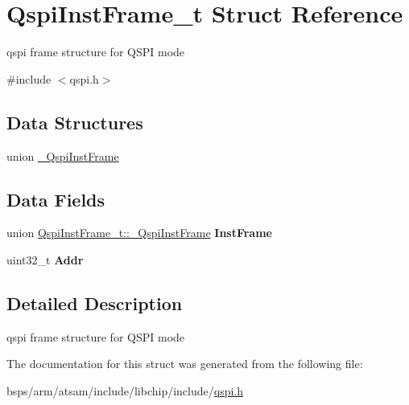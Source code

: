 \hypertarget{structQspiInstFrame__t}{}\section{Qspi\+Inst\+Frame\+\_\+t Struct Reference}
\label{structQspiInstFrame__t}


qspi frame structure for Q\+S\+PI mode  




{\ttfamily \#include $<$qspi.\+h$>$}

\subsection*{Data Structures}
\begin{DoxyCompactItemize}
\item 
union \mbox{\hyperlink{unionQspiInstFrame__t_1_1__QspiInstFrame}{\+\_\+\+Qspi\+Inst\+Frame}}
\end{DoxyCompactItemize}
\subsection*{Data Fields}
\begin{DoxyCompactItemize}
\item 
\mbox{\label{structQspiInstFrame__t_a93768e0ad952fa292a2b71d196636d83}} 
union \mbox{\hyperlink{unionQspiInstFrame__t_1_1__QspiInstFrame}{Qspi\+Inst\+Frame\+\_\+t\+::\+\_\+\+Qspi\+Inst\+Frame}} {\bfseries Inst\+Frame}
\item 
\mbox{\label{structQspiInstFrame__t_a2670b2838065b64cf60d884cf0392563}} 
uint32\+\_\+t {\bfseries Addr}
\end{DoxyCompactItemize}


\subsection{Detailed Description}
qspi frame structure for Q\+S\+PI mode 

The documentation for this struct was generated from the following file\+:\begin{DoxyCompactItemize}
\item 
bsps/arm/atsam/include/libchip/include/\mbox{\hyperlink{qspi_8h}{qspi.\+h}}\end{DoxyCompactItemize}
